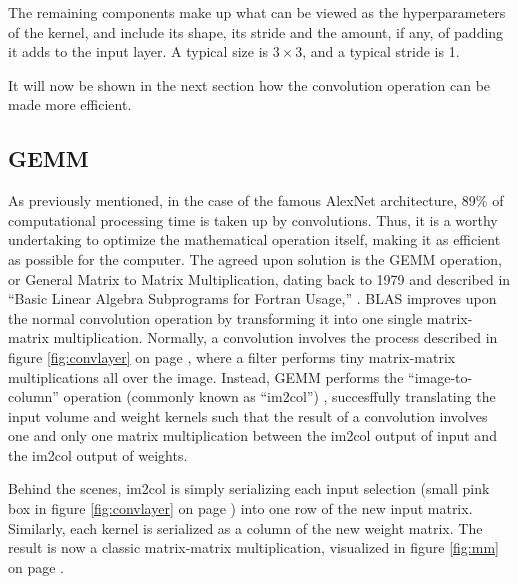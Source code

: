 The remaining components make up what can be viewed as the hyperparameters of the kernel, and include its shape, its stride and the amount, if any, of padding it adds to the input layer. A typical size is $3\times3$, and a typical stride is 1.

\label{fig:convlayer}

It will now be shown in the next section how the convolution operation can be made more efficient.

\subsection{GEMM}
As previously mentioned, in the case of the famous AlexNet architecture, 89\% of computational processing time is taken up by convolutions. Thus, it is a worthy undertaking to optimize the mathematical operation itself, making it as efficient as possible for the computer. The agreed upon solution is the GEMM operation, or General Matrix to Matrix Multiplication, dating back to 1979 and described in ``Basic Linear Algebra Subprograms for Fortran Usage,'' \cite{BLAS}. BLAS improves upon the normal convolution operation by transforming it into one single matrix-matrix multiplication. Normally, a convolution involves the process described in figure \ref{fig:convlayer} on page \pageref{fig:convlayer}, where a filter performs tiny matrix-matrix multiplications all over the image. Instead, GEMM performs the ``image-to-column'' operation (commonly known as ``im2col'') \cite{im2col}, succesffully translating the input volume and weight kernels such that the result of a convolution involves one and only one matrix multiplication between the im2col output of input and the im2col output of weights.

Behind the scenes, im2col is simply serializing each input selection (small pink box in figure \ref{fig:convlayer} on page \pageref{fig:convlayer}) into one row of the new input matrix. Similarly, each kernel is serialized as a column of the new weight matrix. The result is now a classic matrix-matrix multiplication, visualized in figure \ref{fig:mm} on page \pageref{fig:mm}.

